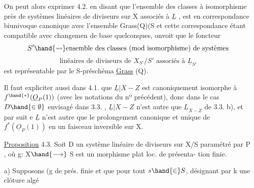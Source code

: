 
On peut alors exprimer 4.2. en disant que l'ensemble des classes
à isomorphisme près de systèmes linéaires de diviseurs sur X associés à
$\underline{L}$ , est en correspondance biunivoque canonique avec l'ensemble 
Grass(Q)(S et cette correspondance étant compatible avec  changemen
de base quelconques, onvoit que le foncteur
\[ S' \hand{\rightsquigarrow} \text{ensemble des classes (mod isomorphisme) de systèmes} \]
\[ \text{linéaires de diviseurs de } X_{S'}/S' \text{ associés à } \underline{L}_{S'} \]
est représentable par le S-préschéma \uline{Grass} (Q).



Il faut expliciter aussi dans 4.1. que $\underline{L}|X-Z$ est canoniquement
isomorphe à $f^{\hand{*}}(\underline{O}_P(1))$ (avec les notations du nº précédent), donc dans
le cas $D \hand{\in\emptyset}$ envisagé dans 3.3. , $\underline{L}|X-Z$ n'est autre que $\underline{L}_{X-Z}$
de 3.3. b), et par suit e $\underline{L}$ n'est autre que le prolongement canonique et
unique de $f^*(\underline{O}_P(1))$ en un faisceau inversible sur X.

\uline{Proposition} 4.3. Soit D un système linéaire de diviseurs sur X/S
paramétré par \hand{$\check{\ }$}P , où g: X$\hand{\longrightarrow}$ S est  un morphisme plat loc. de présenta-%
tion finie.

a) Supposons (g de prés. finie et que pour tout $s \hand{\in} S$, désignant par k une clôture algé

